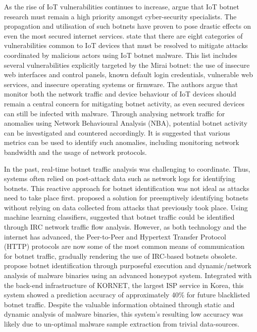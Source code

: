 As the rise of IoT vulnerabilities continues to increase, \citet{Bertino2017} argue that IoT botnet research must remain a high priority amongst cyber-security specialists. The propagation and utilisation of such botnets have proven to pose drastic effects on even the most secured internet services. \citet{Bertino2017} state that there are eight categories of vulnerabilities common to IoT devices that must be resolved to mitigate attacks coordinated by malicious actors using IoT botnet malware. This list includes several vulnerabilities explicitly targeted by the Mirai botnet: the use of insecure web interfaces and control panels, known default login credentials, vulnerable web services, and insecure operating systems or firmware. The authors argue that monitor both the network traffic and device behaviour of IoT devices should remain a central concern for mitigating botnet activity, as even secured devices can still be infected with malware. Through analysing network traffic for anomalies using Network Behavioural Analysis (NBA), potential botnet activity can be investigated and countered accordingly. It is suggested that various metrics can be used to identify such anomalies, including monitoring network bandwidth and the usage of network protocols.

In the past, real-time botnet traffic analysis was challenging to coordinate. Thus, systems often relied on post-attack data such as network logs for identifying botnets. This reactive approach for botnet identification was not ideal as attacks need to take place first. \citet{Lividas2006} proposed a solution for preemptively identifying botnets without relying on data collected from attacks that previously took place. Using machine learning classifiers, \citet{Lividas2006} suggested that botnet traffic could be identified through IRC network traffic flow analysis. However, as both technology and the internet has advanced, the Peer-to-Peer and Hypertext Transfer Protocol (HTTP) protocols are now some of the most common means of communication for botnet traffic, gradually rendering the use of IRC-based botnets obsolete. \citet{Moon2012} propose botnet identification through purposeful execution and dynamic/network analysis of malware binaries using an advanced honeypot system. Integrated with the back-end infrastructure of KORNET, the largest ISP service in Korea, this system showed a prediction accuracy of approximately 40\% for future blacklisted botnet traffic. Despite the valuable information obtained through static and dynamic analysis of malware binaries, this system's resulting low accuracy was likely due to un-optimal malware sample extraction from trivial data-sources.

